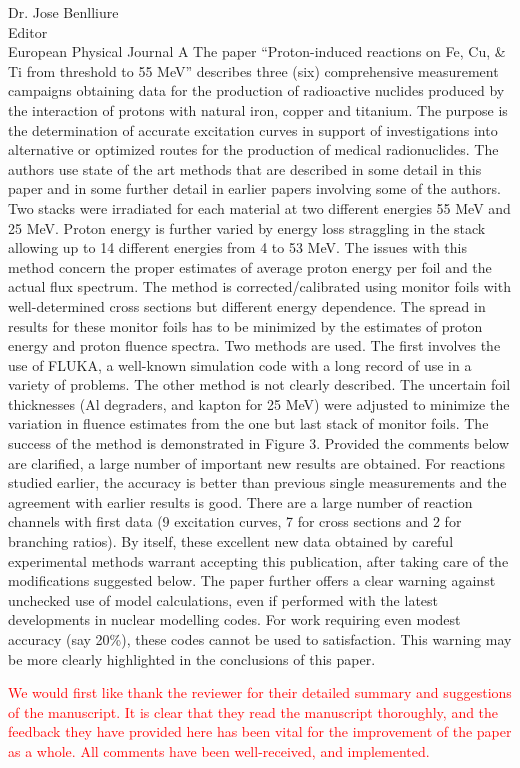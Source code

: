 \documentclass{letter} %
\newcommand{\colornote}[1]{\textcolor{red}{#1}}
\begin{document}
\begin{letter}{Dr. Jose Benlliure \\
Editor \\
European Physical Journal A}
The paper \enquote{Proton-induced reactions on Fe, Cu, \& Ti from threshold to 55 MeV} describes three (six) comprehensive measurement campaigns obtaining data for the production of radioactive nuclides produced by the interaction of protons with natural iron, copper and titanium. The purpose is the determination of accurate excitation curves in support of investigations into alternative or optimized routes for the production of medical radionuclides. The authors use state of the art methods that are described in some detail in this paper and in some further detail in earlier papers involving some of the authors. Two stacks were irradiated for each material at two different energies 55 MeV and 25 MeV. Proton energy is further varied by energy loss straggling in the stack allowing up to 14 different energies from 4 to 53 MeV. The issues with this method concern the proper estimates of average proton energy per foil and the actual flux spectrum. The method is corrected/calibrated using monitor foils with well-determined cross sections but different energy dependence. The spread in results for these monitor foils has to be minimized by the estimates of proton energy and proton fluence spectra. Two methods are used. The first involves the use of FLUKA, a well-known simulation code with a long record of use in a variety of problems. The other method is not clearly described. The uncertain foil thicknesses (Al degraders, and kapton for 25 MeV) were adjusted to minimize the variation in fluence estimates from the one but last stack of monitor foils. The success of the method is demonstrated in Figure 3.
Provided the comments below are clarified, a large number of important new results are obtained. For reactions studied earlier, the accuracy is better than previous single measurements and the agreement with earlier results is good. There are a large number of reaction channels with first data (9 excitation curves, 7 for cross sections and 2 for branching ratios). By itself, these excellent new data obtained by careful experimental methods warrant accepting this publication, after taking care of the modifications suggested below. The paper further offers a clear warning against unchecked use of model calculations, even if performed with the latest developments in nuclear modelling codes. For work requiring even modest accuracy (say 20\%), these codes cannot be used to satisfaction. This warning may be more clearly highlighted in the conclusions of this paper.


\colornote{We would first like thank the reviewer for their  detailed summary and suggestions of the manuscript. It is clear that they read the manuscript thoroughly, and the feedback they have provided here has been vital for the improvement of the paper as a whole. All comments have been well-received, and implemented. }


\end{letter}
\end{document}
